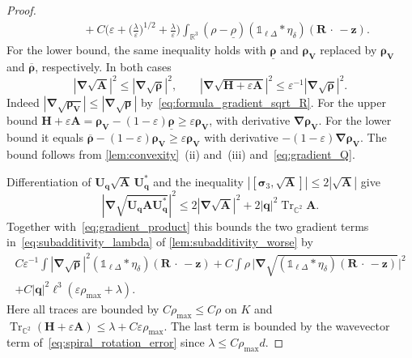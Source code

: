 \documentclass[final,reqno]{amsart}
\theoremstyle{remark}
\renewcommand{\le}{\leqslant}
\renewcommand{\ge}{\geqslant}
\renewcommand{\epsilon}{\varepsilon}
\newcommand{\ol}[1]{\overline{#1}}
\newcommand{\ul}[1]{\underline{#1}}
\DeclareMathOperator{\Tr}{Tr}
\newcommand{\Trs}{\Tr_{\CC^2}}
\newcommand{\RR}{\mathbb{R}}
\newcommand{\CC}{\mathbb{C}}
\newcommand{\iden}{\mathbb{1}}
\newcommand{\grad}{\bm{\nabla}}
\newcommand{\tetra}{\mathbb{\Delta}}
\begin{document}
\begin{proof}
\begin{align*}
&\qquad+C\bigg(\epsilon+\Big(\frac{\lambda}{\epsilon}\Big)^{1/2}+\frac{\lambda}{\epsilon}\bigg)\int_{\RR^3}(\rho-\ul{\rho})(\iden_{\ell\tetra}\ast\eta_\delta)(\mathbf{R}\,\cdot\,-\mathbf{z}).
\end{align*}
For the lower bound, the same inequality holds with $\ul{\bm{\rho}}$ and $\bm{\rho}_{\mathbf{V}}$ replaced by $\bm{\rho}_{\mathbf{V}}$ and $\ol{\bm{\rho}}$, respectively. In both cases
\[
|\grad\sqrt{\mathbf{A}}|^2\le|\grad\sqrt{\bm{\rho}}|^2,\qquad
|\grad\sqrt{\mathbf{H}+\epsilon\mathbf{A}}|^2\le\epsilon^{-1}|\grad\sqrt{\bm{\rho}}|^2 .
\]
Indeed $|\grad\sqrt{\bm{\rho}_{\mathbf{V}}}|\le|\grad\sqrt{\bm{\rho}}|$ by~\cref{eq:formula_gradient_sqrt_R}. For the upper bound $\mathbf{H}+\epsilon\mathbf{A}=\bm{\rho}_{\mathbf{V}}-(1-\epsilon)\ul{\bm{\rho}}\ge\epsilon\bm{\rho}_{\mathbf{V}}$, with derivative $\grad\bm{\rho}_{\mathbf{V}}$. For the lower bound it equals $\ol{\bm{\rho}}-(1-\epsilon)\bm{\rho}_{\mathbf{V}}\ge\epsilon\bm{\rho}_{\mathbf{V}}$ with derivative $-(1-\epsilon)\grad\bm{\rho}_{\mathbf{V}}$. The bound follows from \cref{lem:convexity}~(ii) and~(iii) and~\cref{eq:gradient_Q}.

Differentiation of $\mathbf{U}_{\mathbf{q}}\sqrt{\mathbf{A}}\,\mathbf{U}_{\mathbf{q}}^*$ and the inequality $|[\bm{\sigma}_3,\sqrt{\mathbf{A}}]|\le2|\sqrt{\mathbf{A}}|$ give
\begin{equation}\label{eq:gradient_spiral}
|\grad\sqrt{\mathbf{U}_{\mathbf{q}}\mathbf{A}\mathbf{U}_{\mathbf{q}}^*}|^2\le
2|\grad\sqrt{\mathbf{A}}|^2+2|\mathbf{q}|^2\Trs\mathbf{A}.
\end{equation}
Together with~\cref{eq:gradient_product} this bounds the two gradient terms in~\cref{eq:subadditivity_lambda} of \cref{lem:subadditivity_worse} by
\begin{multline*}
 C\epsilon^{-1}\int|\grad\sqrt{\bm{\rho}}|^2(\iden_{\ell\tetra}\ast\eta_\delta)(\mathbf{R}\,\cdot\,-\mathbf{z})
 + C\int\rho\,\Big|\grad\sqrt{(\iden_{\ell\tetra}\ast\eta_\delta)(\mathbf{R}\,\cdot\,-\mathbf{z})}\Big|^2\\
 +C|\mathbf{q}|^2\ell^3(\epsilon \rho_{\max}+\lambda).
\end{multline*}
Here all traces are bounded by $C\rho_{\max}\le C\rho$ on $K$ and $\Trs(\mathbf{H}+\epsilon\mathbf{A})\le\lambda+C\epsilon \rho_{\max}$. The last term is bounded by the wavevector term of~\cref{eq:spiral_rotation_error} since $\lambda\le C\rho_{\max}d$.


\end{proof}
\end{document}
